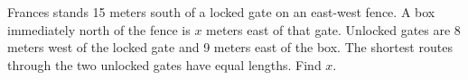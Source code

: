 Frances stands 15 meters south of a locked gate on an east-west fence. A box immediately north of the fence is $x$ meters east of that gate. Unlocked gates are 8 meters west of the locked gate and 9 meters east of the box. The shortest routes through the two unlocked gates have equal lengths. Find $x$.
